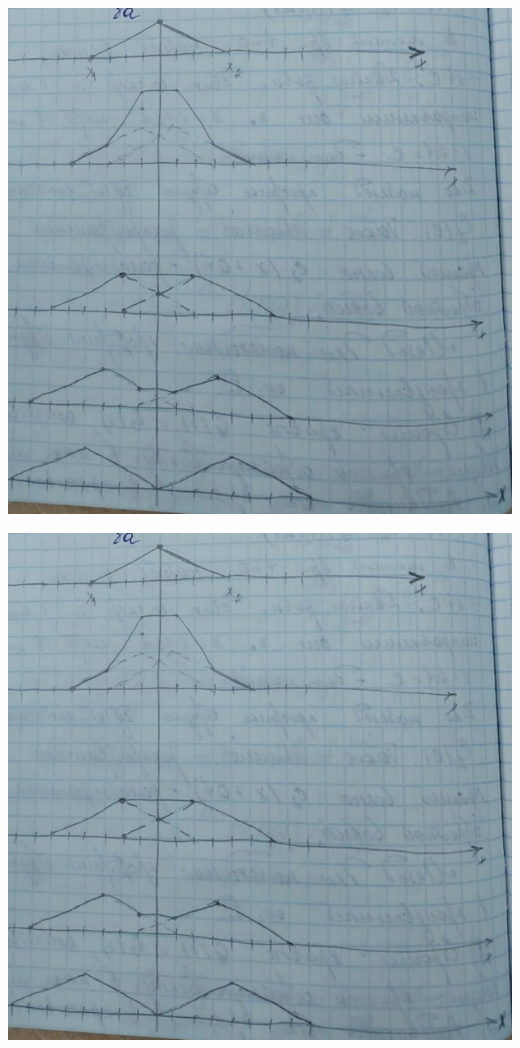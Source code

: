 \documentclass[../main.tex]{subfiles}
\begin{document}
\includegraphics[scale=0.5]{graph_1.jpg}

\includegraphics[scale=0.5]{graph_1.jpg}
\end{document}
